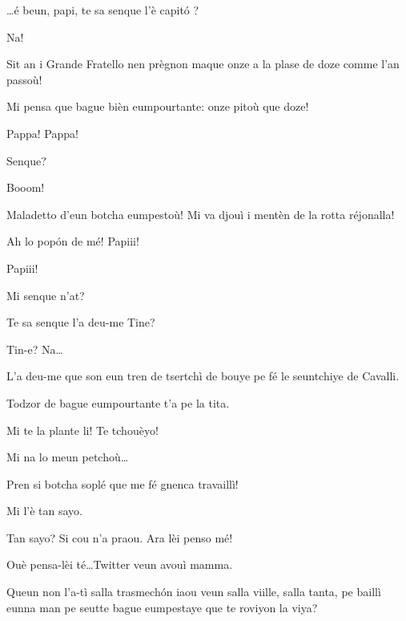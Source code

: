 \begin{drama}
\Alicespeaks{} \ldots é beun, papi, te sa senque l'è capit\'o ? 

\Tanteunspeaks Na!

\Alicespeaks Sit an i Grande Fratello nen prègnon maque onze a la plase de doze comme l’an passoù!

\Tanteunspeaks{} Mi pensa que bague bièn eumpourtante: onze pitoù que doze!

\Twitterspeaks Pappa! Pappa!

\Tanteunspeaks Senque?


\Twitterspeaks Booom!

\Tanteunspeaks{} Maladetto d'eun botcha eumpestoù! Mi va djouì i mentèn de la rotta réjonalla!

\Alicespeaks{} Ah lo pop\'on de mé! Papiii!


\Alicespeaks Papiii!

\Tanteunspeaks Mi senque n'at?

\Alicespeaks Te sa senque l'a deu-me Tine?

\Tanteunspeaks Tin-e? Na\ldots

\Alicespeaks L'a deu-me que son eun tren de tsertchì de bouye pe fé le seuntchiye de Cavalli. 

\Tanteunspeaks{} Todzor de bague eumpourtante t'a pe la tita.


\Tanteunspeaks Mi te la plante li! Te tchouèyo!

\Alicespeaks Mi na lo meun petchoù\ldots

\Tanteunspeaks{} Pren si botcha soplé que me fé gnenca travaillì!

\Alicespeaks Mi l'è tan sayo.

\Tanteunspeaks Tan sayo? Si cou n'a praou. Ara lèi penso mé!


\Alicespeaks Ouè pensa-lèi té\ldots Twitter veun avouì mamma.

\Tanteunspeaks Queun non l'a-tì salla trasmech\'on iaou veun salla viille, salla tanta, pe baillì eunna man pe seutte  bague eumpestaye que te roviyon la viya?


\end{drama}
